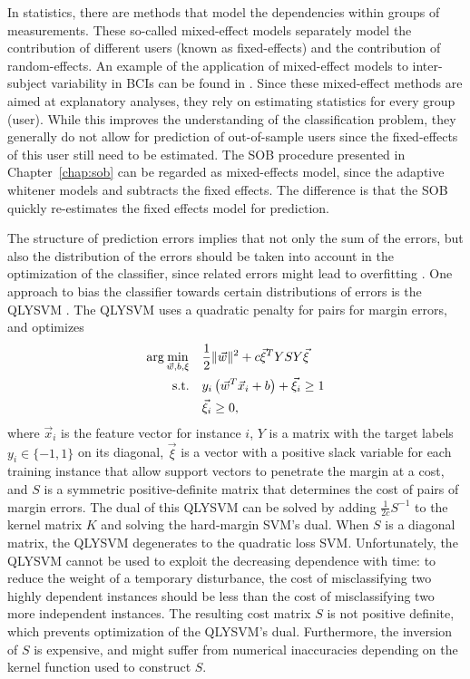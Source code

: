 \begin{sloppypar}
In statistics, there are methods that model the dependencies within groups of
measurements. These so-called mixed-effect models separately model the
contribution of different users (known as fixed-effects) and the contribution
of random-effects. An example of the application of mixed-effect models to
inter-subject variability in \acp{BCI} can be found in \cite{fazli2011lpl}.
Since these mixed-effect methods are aimed at explanatory analyses, they rely
on estimating statistics for every group (user). While this improves the
understanding of the classification problem, they generally do not allow for
prediction of out-of-sample users since the fixed-effects of this user still
need to be estimated. The \ac{SOB} procedure presented in
Chapter~\ref{chap:sob} can be regarded as mixed-effects model, since the
adaptive whitener models and subtracts the fixed effects. The difference is
that the \ac{SOB} quickly re-estimates the fixed effects model for prediction.
\end{sloppypar}

The structure of prediction errors implies that not only the sum of the
errors, but also the distribution of the errors should be taken into account in
the optimization of the classifier, since related errors might lead to overfitting \cite{pindyck1991eme}. One approach to bias the classifier towards
certain distributions of errors is the \ac{QLYSVM} \cite{portera2004gql}. The
\ac{QLYSVM} uses a quadratic penalty for pairs for margin errors, and
optimizes 
\begin{align}
  \arg\min_{\vec{w},b,\xi} \quad
  & \frac{1}{2}\lVert\vec{w}\rVert^2 
  + c \vec{\xi}^T Y S Y \vec{\xi}
\\
  \text{s.t.} \quad 
  & y_i \left(\vec{w}^T \vec{x}_i + b\right) + \vec{\xi}_i \ge 1
\\
  & \vec{\xi}_i \ge 0,
\end{align}
%
where $\vec{x}_i$ is the feature vector for instance $i$, $Y$ is a matrix with
the target labels $y_i \in \{-1, 1\}$ on its diagonal, $\vec{\xi}$ is a vector
with a positive slack variable for each training instance that allow support
vectors to penetrate the margin at a cost, and $S$ is a symmetric
positive-definite matrix that determines the cost of
pairs of margin errors.
%
The dual of this \ac{QLYSVM} can be solved by adding $\frac{1}{2c}S^{-1}$ to
the kernel matrix $K$ and solving the hard-margin \ac{SVM}'s dual. When $S$ is a
diagonal matrix, the \ac{QLYSVM} degenerates to the quadratic loss \ac{SVM}.
%
Unfortunately, the \ac{QLYSVM} cannot be used to exploit the decreasing
dependence with time: to reduce the weight of a temporary disturbance, the cost
of misclassifying two highly dependent instances should be less than the cost
of misclassifying two more independent instances. The resulting cost matrix $S$
is not positive definite, which prevents optimization of the \ac{QLYSVM}'s dual. Furthermore, the inversion of $S$ is expensive,
and might suffer from numerical inaccuracies depending on the kernel function
used to construct $S$.
